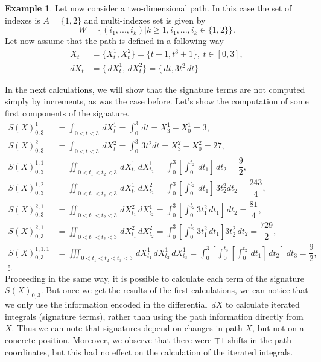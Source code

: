 \documentclass[12pt,a4paper]{report}
\theoremstyle{definition}
\newtheorem{example}{Example}
\begin{document}
\begin{example}
	Let now consider a two-dimensional path. In this case the set of indexes is $A=\{1,2\}$ and multi-indexes set is given by
	\begin{equation}	
		W=\{(i_1,...,i_k)|k\geq1, i_1,...,i_k\in \{1,2\}\}.
	\end{equation}	
Let now assume that the path is	defined in a following way
\begin{equation}	
	\begin{aligned}
	X_t&=\{X_t^{1},X_t^{2}\}=\{t-1,t^3+1\}, \: t \in [0,3],\\
	dX_t&=\{\,dX_t^{1},\,dX_t^{2}\}=\{\,dt,3t^2\,dt\}
	\end{aligned}	
\end{equation}	

In the next calculations, we will show that the signature terms are not computed simply by increments, as was the case before.  Let's show the computation of some first components of the signature.
	\begin{equation}	
	\begin{aligned}
		S(X)_{0,3}^{1}&=\int_{0<t<3}\, dX^1_t=\int_0^3\, dt=X^1_3-X^1_0=3, \\ 
		S(X)_{0,3}^{2}&=\int_{0<t<3}\, dX^2_t=\int_0^3\, 3t^2dt=X^2_3-X^2_0=27, \\
		S(X)_{0,3}^{1,1}&=\iint_{0<t_1<t_2<3}\, dX^1_{t_1}\,dX^1_{t_2}=\int_0^3[\int_0^{t_2}\,dt_1]\, dt_2=\dfrac{9}{2}, \\ 
		S(X)_{0,3}^{1,2}&=\iint_{0<t_1<t_2<3}\, dX^1_{t_1}\,dX^2_{t_2}=\int_0^3[\int_0^{t_2}\,dt_1]\, 3t_2^2dt_2=\dfrac{243}{4}, \\ 
		S(X)_{0,3}^{2,1}&=\iint_{0<t_1<t_2<3}\, dX^2_{t_1}\,dX^1_{t_2}=\int_0^3[\int_0^{t_2}3t_1^2\,dt_1]\, dt_2=\dfrac{81}{4}, \\ 
			S(X)_{0,3}^{2,1}&=\iint_{0<t_1<t_2<3}\, dX^2_{t_1}\,dX^2_{t_2}=\int_0^3[\int_0^{t_2}3t_1^2\,dt_1]3t_2^2\, dt_2=\dfrac{729}{2}, \\ 
		S(X)_{0,3}^{1,1,1}&=\iiint_{0<t_1<t_2<t_3<3}\, dX^1_{t_1}\,dX^1_{t_2}\,dX^1_{t_3}=\int_0^3[\int_0^{t_3}[\int_0^{t_2}\,dt_1]\,dt_2]\, dt_3=\dfrac{9}{2}, \\  
		\vdots .			
	\end{aligned}	
\end{equation}	
Proceeding in the same way, it is possible to calculate each term of the signature $S(X)_{0,3}$. But once we get the results of the first calculations, we can notice that we only use the information encoded in the differential $\,dX$ to calculate iterated integrals (signature terms), rather than using the path information directly from $X$. Thus we can note that signatures depend on changes in path $X$, but not on a concrete position. Moreover, we observe that there were $\mp 1$ shifts in the path coordinates, but this had no effect on the calculation of the iterated integrals.

\end{example}
\end{document}
